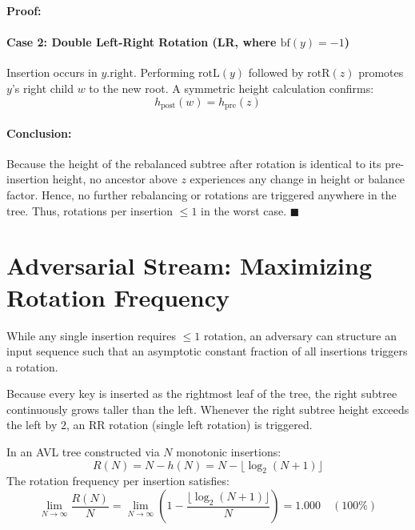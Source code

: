 \documentclass[11pt,a4paper]{article}
\newenvironment{proof}{\noindent\textbf{Proof:}\enspace}{\hfill$\blacksquare$\par\medskip}
\begin{document}
\begin{proof}
\paragraph{Case 2: Double Left-Right Rotation (LR, where $\text{bf}(y) = -1$)}
Insertion occurs in $y.\text{right}$. Performing $\text{rotL}(y)$ followed by $\text{rotR}(z)$ promotes $y$'s right child $w$ to the new root. A symmetric height calculation confirms:
\begin{equation}
h_{\text{post}}(w) = h_{\text{pre}}(z)
\end{equation}

\paragraph{Conclusion:}
Because the height of the rebalanced subtree after rotation is identical to its pre-insertion height, no ancestor above $z$ experiences any change in height or balance factor. Hence, no further rebalancing or rotations are triggered anywhere in the tree. Thus, rotations per insertion $\le 1$ in the worst case.
\end{proof}

\section{Adversarial Stream: Maximizing Rotation Frequency}
While any single insertion requires $\le 1$ rotation, an adversary can structure an input sequence such that an asymptotic constant fraction of all insertions triggers a rotation.

\noindent{}
\vspace{0.8em}

Because every key is inserted as the rightmost leaf of the tree, the right subtree continuously grows taller than the left. Whenever the right subtree height exceeds the left by $2$, an RR rotation (single left rotation) is triggered.

In an AVL tree constructed via $N$ monotonic insertions:
\begin{equation}
R(N) = N - h(N) = N - \lfloor \log_2(N + 1) \rfloor
\end{equation}
The rotation frequency per insertion satisfies:
\begin{equation}
\lim_{N \to \infty} \frac{R(N)}{N} = \lim_{N \to \infty} \left( 1 - \frac{\lfloor \log_2(N + 1) \rfloor}{N} \right) = 1.000 \quad (100\%)
\end{equation}
\end{document}
